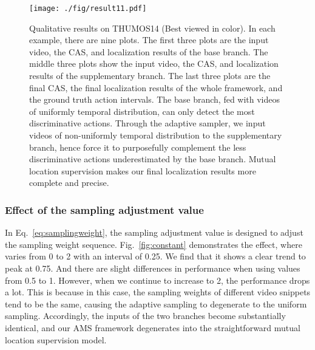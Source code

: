 \documentclass[journal]{IEEEtran}
\begin{document}
\begin{figure*}[t]
\centering
\centerline{\texttt{[image: ./fig/result11.pdf]}} 
\vspace{5pt}
\caption{Qualitative results on THUMOS14 (Best viewed in color). In each example, there are nine plots. The first three plots are the input video, the CAS, and localization results of the base branch. The middle three plots show the input video, the CAS, and localization results of the supplementary branch. The last three plots are the final CAS, the final localization results of the whole framework, and the ground truth action intervals. The base branch, fed with videos of uniformly temporal distribution, can only detect the most discriminative actions. Through the adaptive sampler, we input videos of non-uniformly temporal distribution to the supplementary branch, hence force it to purposefully complement the less discriminative actions underestimated by the base branch. Mutual location supervision makes our final localization results more complete and precise.}
\vspace{5pt}
\label{fig: Qualitative Results}
\end{figure*}



\subsubsection{Effect of the sampling adjustment value }
In Eq.~\ref{eq:samplingweight}, the sampling adjustment value  is designed to adjust the sampling weight sequence. Fig.~\ref{fig:constant} demonstrates the effect, where  varies from 0 to 2 with an interval of 0.25. We find that it shows a clear trend to peak at 0.75. And there are slight differences in performance when using values from 0.5 to 1. However, when we continue to increase  to 2, the performance drops a lot. This is because in this case, the sampling weights of different video snippets tend to be the same, causing the adaptive sampling to degenerate to the uniform sampling. Accordingly, the inputs of the two branches become substantially identical, and our AMS framework degenerates into the straightforward mutual location supervision model.
\end{document}
